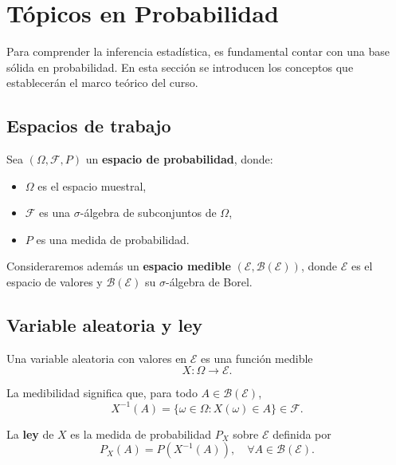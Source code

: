 
\section{Tópicos en Probabilidad}

Para comprender la inferencia estadística, es fundamental contar con una base sólida en probabilidad. En esta sección se introducen los conceptos que establecerán el marco teórico del curso.

\subsection{Espacios de trabajo}

Sea $(\Omega,\mathcal{F},P)$ un \textbf{espacio de probabilidad}, donde:
\begin{itemize}
\item $\Omega$ es el espacio muestral,
\item $\mathcal{F}$ es una $\sigma$-álgebra de subconjuntos de $\Omega$,
\item $P$ es una medida de probabilidad.
\end{itemize}

Consideraremos además un \textbf{espacio medible} $(\mathcal{E},\mathcal{B}(\mathcal{E}))$, donde $\mathcal{E}$ es el espacio de valores y $\mathcal{B}(\mathcal{E})$ su $\sigma$-álgebra de Borel.

\subsection{Variable aleatoria y ley}

\begin{defi}
Una variable aleatoria con valores en $\mathcal{E}$ es una función medible
\[
X:\Omega \to \mathcal{E}.
\]
\end{defi}

La medibilidad significa que, para todo $A \in \mathcal{B}(\mathcal{E})$,
\[
X^{-1}(A) = \{\omega \in \Omega : X(\omega) \in A\} \in \mathcal{F}.
\]

\begin{defi}
La \textbf{ley} de $X$ es la medida de probabilidad $P_X$ sobre $\mathcal{E}$ definida por
\[
P_X(A) = P(X^{-1}(A)), \quad \forall A \in \mathcal{B}(\mathcal{E}).
\]
\end{defi}

